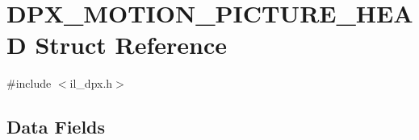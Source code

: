 \hypertarget{struct_d_p_x___m_o_t_i_o_n___p_i_c_t_u_r_e___h_e_a_d}{\section{D\-P\-X\-\_\-\-M\-O\-T\-I\-O\-N\-\_\-\-P\-I\-C\-T\-U\-R\-E\-\_\-\-H\-E\-A\-D Struct Reference}
\label{struct_d_p_x___m_o_t_i_o_n___p_i_c_t_u_r_e___h_e_a_d}
}


{\ttfamily \#include $<$il\-\_\-dpx.\-h$>$}

\subsection*{Data Fields}

